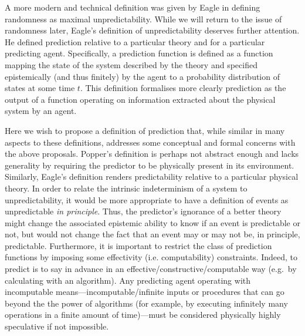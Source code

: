 \documentclass[%
 superscriptaddress,
 preprint,
 showpacs,
 showkeys,
 preprintnumbers,
  amsmath,amssymb,
  aps,
 pra,
  longbibliography,
  floatfix,
 ]{revtex4-1}
\theoremstyle{definition}
\begin{document}
A more modern and technical definition was given by Eagle \cite{Eagle:2005ys} in defining randomness as maximal unpredictability.
While we will return to the issue of randomness later, Eagle's definition of unpredictability deserves further attention.
He defined prediction relative to a particular theory and for a particular predicting agent.
Specifically, a prediction function is defined as a function mapping the state of the system described by the theory and specified epistemically (and thus finitely) by the agent to a probability distribution of states at some time $t$.
This definition formalises more clearly prediction as the output of a function operating on information extracted about the physical system by an agent.

Here we wish to propose a definition of prediction that, while similar in many aspects to these definitions, addresses  some conceptual and formal concerns with the above proposals.
Popper's definition is perhaps not abstract enough and lacks generality by requiring the predictor to be physically present in its environment.
Similarly, Eagle's definition renders predictability relative to a particular physical theory.
In order to relate the intrinsic indeterminism of a system to unpredictability, it would be more appropriate to have a definition of events as unpredictable \emph{in principle}.
Thus, {\color{green} the predictor's ignorance} of a better theory might change {\color{green} the associated} epistemic ability to know if an event is predictable or not, but would not change the fact that an event may or may not be, in principle, predictable.
Furthermore,  it is important to restrict the class of prediction functions by imposing some effectivity (i.e. computability) constraints.
Indeed, to predict is to say in advance %
in an effective/constructive/computable way (e.g.\ by calculating with an algorithm).
Any predicting agent operating with incomputable means---incomputable/infinite inputs or procedures that can go beyond the
the power of algorithms (for example, by executing infinitely many operations in a finite amount of time)---{\color{green}must be considered physically highly speculative if not impossible}.
\end{document}
